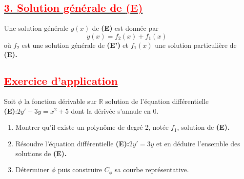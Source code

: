 \documentclass{article}
\begin{document}
\subsection*{\underline{\textbf{\textcolor{red}{3. Solution générale de \textbf{(E)}}}}}
Une solution générale $y(x)$ de \textbf{(E)} est donnée par \[y(x)=f_{2}(x)+f_{1}(x)\] où $f_{2}$ est une solution générale de \textbf{(E')} et $f_{1}(x)$ une solution particulière de \textbf{(E).}
\subsection*{\underline{\textbf{\textcolor{red}{Exercice d'application}}}}
Soit $\phi$ la fonction dérivable sur $\mathbb{R}$ solution de l'équation différentielle\\
\textbf{(E)}:$2y'-3y=x^{2}+5$ dont la dérivée s'annule en 0.
\begin{enumerate}
    \item Montrer qu'il existe un polynôme de degré 2, notée $f_{1}$, solution de \textbf{(E).}
    \item Résoudre l'équation différentielle \textbf{(E):}$2y'=3y$ et en déduire l'ensemble des solutions de \textbf{(E).}
    \item Déterminer $\phi$ puis construire $C_{\phi}$ sa courbe représentative. 
\end{enumerate}
\end{document}
